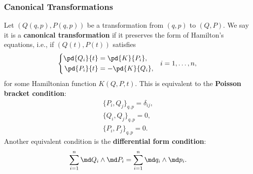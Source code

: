 \subsubsection*{Canonical Transformations}
Let $(Q(q,p),P(q,p))$ be a transformation from $(q,p)$ to $(Q,P)$. We say
it is a \textbf{canonical transformation} if it preserves the form of 
Hamilton's equations, i.e., if $(Q(t),P(t))$ satisfies
\begin{equation*}
    \left\{
    \begin{aligned}
        \pd{Q_i}{t} &= \pd{K}{P_i}, \\
        \pd{P_i}{t} &= -\pd{K}{Q_i},
    \end{aligned}
    \quad i=1,\ldots,n,\right.
\end{equation*}
for some Hamiltonian function $K(Q,P,t)$. This is equivalent to the 
\textbf{Poisson bracket condition}:
\begin{gather*}
    \{P_i,Q_j\}_{q,p} = \delta_{ij}, \\
    \{Q_i,Q_j\}_{q,p} = 0, \\
    \{P_i,P_j\}_{q,p} = 0.
\end{gather*}
Another equivalent condition is the \textbf{differential form condition}:
\begin{equation*}
    \sum_{i=1}^n\md Q_i\wedge\md P_i=\sum_{i=1}^n\md q_i\wedge\md p_i.
\end{equation*}


